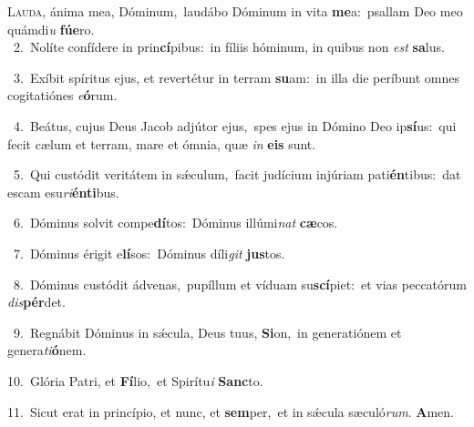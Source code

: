 \lettrine{\initial\textcolor{\initialcolor}{L}}{auda,} ánima mea, Dóminum,~\dagger laudábo Dóminum in vita \textbf{me}\-a:~\star psallam Deo meo quámdi\textit{u} \textbf{fú}\-\textbf{e}ro.\\
{\numbfont\textcolor{\numbcolor}{~2.}}~Nolíte confídere in prin\-\textbf{cí}\-pibus:~\star in fíliis hóminum, in quibus non \textit{est} \textbf{sa}\-lus.\par
{\numbfont\textcolor{\numbcolor}{~3.}}~Exíbit spíritus ejus, et revertétur in terram \textbf{su}\-am:~\star in illa die períbunt omnes cogitatiónes \textit{e}\-\textbf{ó}rum.\par
{\numbfont\textcolor{\numbcolor}{~4.}}~Beátus, cujus Deus Jacob adjútor ejus,~\dagger spes ejus in Dómino Deo ip\-\textbf{sí}\-us:~\star qui fecit cælum et terram, mare et ómnia, quæ \textit{in} \textbf{e}\-\textbf{is} sunt.\par
{\numbfont\textcolor{\numbcolor}{~5.}}~Qui custódit veritátem in sǽculum,~\dagger facit judícium injúriam pati\-\textbf{én}\-tibus:~\star dat escam esu\-\textit{ri}\-\textbf{én}\textbf{ti}bus.\par
{\numbfont\textcolor{\numbcolor}{~6.}}~Dóminus solvit compe\-\textbf{dí}\-tos:~\star Dóminus illúmi\textit{nat} \textbf{cæ}\-cos.\par
{\numbfont\textcolor{\numbcolor}{~7.}}~Dóminus érigit e\-\textbf{lí}\-sos:~\star Dóminus díli\textit{git} \textbf{jus}\-tos.\par
{\numbfont\textcolor{\numbcolor}{~8.}}~Dóminus custódit ádvenas,~\dagger pupíllum et víduam su\-\textbf{scí}\-piet:~\star et vias peccatórum \textit{dis}\-\textbf{pér}det.\par
{\numbfont\textcolor{\numbcolor}{~9.}}~Regnábit Dóminus in sǽcula, Deus tuus, \textbf{Si}\-on,~\star in generatiónem et genera\-\textit{ti}\-\textbf{ó}nem.\par
{\numbfont\textcolor{\numbcolor}{10.}}~Glória Patri, et \textbf{Fí}\-lio,~\star et Spirítu\textit{i} \textbf{Sanc}\-to.\par
{\numbfont\textcolor{\numbcolor}{11.}}~Sicut erat in princípio, et nunc, et \textbf{sem}\-per,~\star et in sǽcula sæculó\-\textit{rum}\-. \textbf{A}\-men.\par
